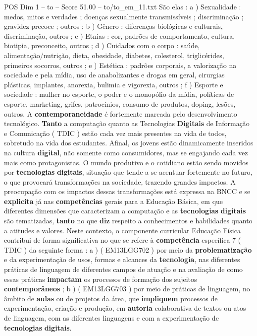 \begin{textsample}{POS Dim 1 – to – Score 51.00 – to/to\_em\_11.txt}
São elas : a ) Sexualidade : medos, mitos e verdades ; doenças sexualmente transmissíveis ; discriminação ; gravidez precoce ; outros ; b ) Gênero : diferenças biológicas e culturais, discriminação, outros ; c ) Etnias : cor, padrões de comportamento, cultura, biotipia, preconceito, outros ; d ) Cuidados com o corpo : saúde, alimentação/nutrição, dieta, obesidade, diabetes, colesterol, triglicérides, primeiros socorros, outros ; e ) Estética : padrões corporais, a valorização na sociedade e pela mídia, uso de anabolizantes e drogas em geral, cirurgias plásticas, implantes, anorexia, bulimia e vigorexia, outros ; f ) Esporte e sociedade : mulher no esporte, o poder e o monopólio da mídia, políticas de esporte, marketing, grifes, patrocínios, consumo de produtos, doping, lesões, outros.
A \textbf{contemporaneidade} é fortemente marcada pelo desenvolvimento tecnológico. \textbf{Tanto} a computação quanto as Tecnologias \textbf{Digitais} de Informação e Comunicação ( TDIC ) estão cada vez mais presentes na vida de todos, sobretudo na vida dos estudantes.
Afinal, os jovens estão dinamicamente inseridos na cultura \textbf{digital}, não somente como consumidores, mas se engajando cada vez mais como protagonistas.
O mundo produtivo e o cotidiano estão sendo movidos por \textbf{tecnologias} \textbf{digitais}, situação que tende a se acentuar fortemente no futuro, o que provocará transformações na sociedade, trazendo grandes impactos.
A preocupação com os impactos dessas transformações está expressa na BNCC e se \textbf{explicita} já nas \textbf{competências} gerais para a Educação Básica, em que diferentes dimensões que caracterizam a computação e as \textbf{tecnologias} \textbf{digitais} são tematizadas, \textbf{tanto} no que \textbf{diz} respeito a conhecimentos e habilidades quanto a atitudes e valores.
Neste contexto, o componente curricular Educação Física contribui de forma significativa no que se refere à \textbf{competência} específica 7 ( TDIC ) da seguinte forma : a ) ( EM13LGG702 ) por meio da \textbf{problematização} e da experimentação de usos, formas e alcances da \textbf{tecnologia}, nas diferentes práticas de linguagem de diferentes campos de atuação e na avaliação de como essas práticas \textbf{impactam} os processos de formação dos sujeitos \textbf{contemporâneos} ; b ) ( EM13LGG703 ) por meio de práticas de linguagem, no âmbito de \textbf{aulas} ou de projetos da área, que \textbf{impliquem} processos de experimentação, criação e produção, em \textbf{autoria} colaborativa de textos ou atos de linguagem, com as diferentes linguagens e com a experimentação de \textbf{tecnologias} \textbf{digitais}.

\end{textsample}
